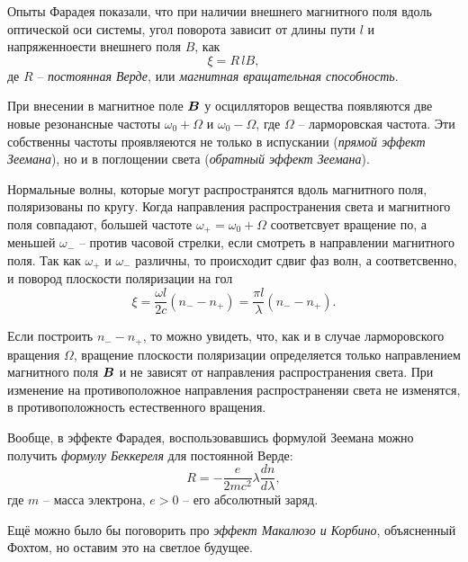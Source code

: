 Опыты Фарадея показали, что при наличии внешнего магнитного поля вдоль оптической оси системы, угол поворота зависит от длины пути $l$ и напряженноести внешнего поля $B$, как
\begin{equation*}
    \xi = R\, l B,
\end{equation*}
де $R$ -- \textit{постоянная Верде}, или \textit{магнитная вращательная способность}. 

При внесении в магнитное поле $\mbox{\boldmath $B$}$ у осцилляторов вещества появляются две новые резонансные частоты $\omega_0 + \Omega$ и $\omega_0 - \Omega$, где $\Omega$ -- ларморовская частота. Эти собственны частоты проявляеются не только в испускании (\textit{прямой эффект Зеемана}), но и в поглощении света (\textit{обратный эффект Зеемана}). 

Нормальные волны, которые могут распространятся вдоль магнитного поля, поляризованы по кругу. Когда направления распространения света и магнитного поля совпадают, большей частоте $\omega_+ = \omega_0 + \Omega$ соответсвует вращение по, а меньшей $\omega_-$ -- против часовой стрелки, если смотреть в направлении магнитного поля. Так как $\omega_+$ и $\omega_-$ различны, то происходит сдвиг фаз волн, а соответсвенно, и повород плоскости поляризации на гол
\begin{equation*}
    \xi = \frac{\omega l}{2c} (n_- - n_+) = \frac{\pi l}{\lambda} (n_- - n_+).
\end{equation*}

Если построить $n_- - n_+$, то можно увидеть, что, как и в случае ларморовского вращения $\Omega$, вращение плоскости поляризации определяется только направлением магнитного поля $\mbox{\boldmath $B$}$ и не зависят от направления распространения света.  При изменение на противоположное направления распространеняи света не изменятся, в противоположность естественного вращения. 

Вообще, в эффекте Фарадея, воспользовавшись формулой Зеемана можно получить \textit{формулу Беккереля} для постоянной Верде:
\begin{equation*}
    R = - \frac{e}{2 mc^2} \lambda \frac{d n}{d \lambda},
\end{equation*}
где $m$ -- масса электрона, $e > 0$ -- его абсолютный заряд.  


Ещё можно было бы поговорить про \textit{эффект Макалюзо и Корбино}, объясненный Фохтом, но оставим это на светлое будущее. 


